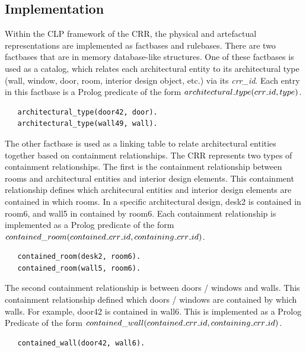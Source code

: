 \documentclass[12pt]{ucthesis}
\begin{document}
\subsection{Implementation}
Within the CLP framework of the CRR, the physical and artefactual representations are implemented as factbases and rulebases. There are two factbases that are in memory database-like structures. One of these factbases is used as a catalog, which relates each architectural entity to its architectural type (wall, window, door, room, interior design object, etc.) via its \emph{crr\_id}. Each entry in this factbase is a Prolog predicate of the form $architectural \mathunderscore type(crr \mathunderscore id, type)$.
\begin{verbatim}
   architectural_type(door42, door).
   architectural_type(wall49, wall).
\end{verbatim} The other factbase is used as a linking table to relate architectural entities together based on containment relationships. The CRR represents two types of containment relationships. The first is the containment relationship between rooms and architectural entities and interior design elements. This containment relationship defines which architecural entities and interior design elements are contained in which rooms. In a specific architectural design, desk2 is contained in room6, and wall5 in contained by room6. Each containment relationship is implemented as a Prolog predicate of the form $contained\_room(contained \mathunderscore crr \mathunderscore id, containing \mathunderscore crr \mathunderscore id)$.
\begin{verbatim}
   contained_room(desk2, room6).
   contained_room(wall5, room6).
\end{verbatim} The second containment relationship is between doors / windows and walls. This containment relationship defined which doors / windows are contained by which walls. For example, door42 is contained in wall6. This is implemented as a Prolog Predicate of the form $contained\_wall(contained \mathunderscore crr \mathunderscore id, containing \mathunderscore crr \mathunderscore id)$.
\begin{verbatim}
   contained_wall(door42, wall6).
\end{verbatim} 
\end{document}
